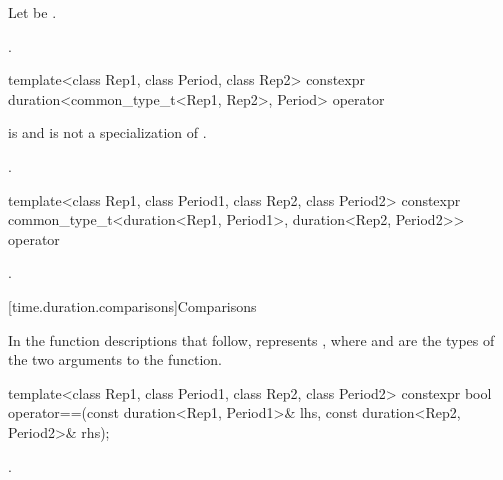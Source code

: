 \begin{itemdescr}
\pnum
Let  be
.

\pnum
\returns
{}.
\end{itemdescr}

%
\begin{itemdecl}
template<class Rep1, class Period, class Rep2>
  constexpr duration<common_type_t<Rep1, Rep2>, Period>
    operator%
\end{itemdecl}

\begin{itemdescr}
\pnum
\constraints
{} is  and
 is not a specialization of .

\pnum
\returns
{}.
\end{itemdescr}

%
\begin{itemdecl}
template<class Rep1, class Period1, class Rep2, class Period2>
  constexpr common_type_t<duration<Rep1, Period1>, duration<Rep2, Period2>>
    operator%
\end{itemdecl}

\begin{itemdescr}
\pnum
\returns
{}.
\end{itemdescr}


[time.duration.comparisons]{Comparisons}

\pnum
In the function descriptions that follow,  represents
, where  and  are the types of
the two arguments to the function.

%
\begin{itemdecl}
template<class Rep1, class Period1, class Rep2, class Period2>
  constexpr bool operator==(const duration<Rep1, Period1>& lhs,
                            const duration<Rep2, Period2>& rhs);
\end{itemdecl}

\begin{itemdescr}
\pnum
\returns
{}.
\end{itemdescr}

